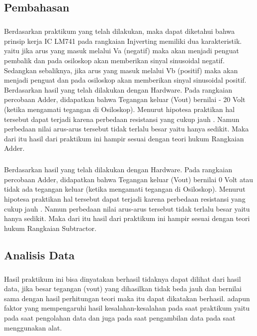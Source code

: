 \documentclass[12pt,a4paper]{article}
\begin{document}
\newpage
\subsection{Pembahasan}
\subparagraph{ }
	Berdasarkan praktikum yang telah dilakukan, maka dapat diketahui bahwa prinsip kerja IC LM741 pada rangkaian Injverting memiliki dua karakteristik. yaitu jika arus yang masuk melalui Va (negatif) maka akan menjadi penguat pembalik dan pada osiloskop akan memberikan sinyal sinusoidal negatif. Sedangkan sebaliknya, jika arus yang masuk melalui Vb (positif) maka akan menjadi penguat dan pada osiloskop akan memberikan sinyal sinusoidal positif.
	Berdasarkan hasil yang telah dilakukan dengan Hardware. Pada rangkaian percobaan Adder, didapatkan bahwa Tegangan keluar (Vout) bernilai - 20 Volt (ketika mengamati tegangan di Osiloskop). Menurut hipotesa praktikan hal tersebut dapat terjadi karena perbedaan resistansi yang cukup jauh . Namun perbedaan nilai arus-arus tersebut tidak terlalu besar yaitu hanya sedikit. Maka dari itu hasil dari praktikum ini hampir sesuai dengan teori hukum Rangkaian Adder.
\subparagraph{ }
	Berdasarkan hasil yang telah dilakukan dengan Hardware. Pada rangkaian percobaan Adder, didapatkan bahwa Tegangan keluar (Vout) bernilai 0 Volt atau tidak ada tegangan keluar (ketika mengamati tegangan di Osiloskop). Menurut hipotesa praktikan hal tersebut dapat terjadi karena perbedaan resistansi yang cukup jauh . Namun perbedaan nilai arus-arus tersebut tidak terlalu besar yaitu hanya sedikit. Maka dari itu hasil dari praktikum ini hampir sesuai dengan teori hukum Rangkaian Subtractor.
\newpage
 
\subsection{Analisis Data}
\subparagraph{}
	Hasil praktikum ini bisa dinyatakan berhasil tidaknya dapat dilihat dari hasil data, jika besar tegangan (vout) yang dihasilkan tidak beda jauh dan bernilai sama dengan hasil perhitungan teori maka itu dapat dikatakan berhasil. adapun faktor yang mempengaruhi hasil kesalahan-kesalahan pada saat praktikum yaitu pada saat pengolahan data dan juga pada saat pengambilan data pada saat menggunakan alat.
 

\newpage
\end{document}
